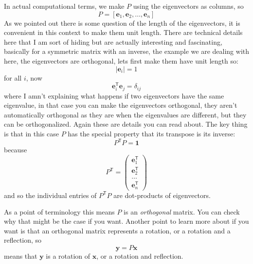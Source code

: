 \documentclass[12pt]{article}
\begin{document}
In actual computational terms, we make $P$ using the eigenvectors as
columns, so
\begin{equation}
  P=[\mathbf{e}_1,\mathbf{e}_2,\ldots,\mathbf{e}_n]
\end{equation}
As we pointed out there is some question of the length of the
eigenvectors, it is convenient in this context to make them unit
length. There are technical details here that I am sort of hiding but
are actually interesting and fascinating, basically for a symmetric
matrix with an inverse, the example we are dealing with here, the
eigenvectors are orthogonal, lets first make them have unit length so:
\begin{equation}
|\mathbf{e}_i|=1
\end{equation}
for all $i$, now
\begin{equation}
\mathbf{e}_i^{\mathsf T}\mathbf{e}_j=\delta_{ij}
\end{equation}
where I amn't explaining what happens if two eigenvectors have the
same eigenvalue, in that case you can make the eigenvectors
orthogonal, they aren't automatically orthogonal as they are when the
eigenvalues are different, but they can be orthogonalized. Again these
are details you can read about. The key thing is that in this case $P$
has the special property that its transpose is its inverse:
\begin{equation}
P^{\mathsf T}P=\mathbf{1}
\end{equation}
because
\begin{equation}
  P^{\mathsf T}=\begin{pmatrix} \mathbf{e}_1^{\mathsf T}\\ \mathbf{e}_2^{\mathsf T}\\\ldots\\ \mathbf{e}_n^{\mathsf T}
  \end{pmatrix}
\end{equation}
and so the individual entries of $P^{\mathsf T}P$ are dot-products of eigenvectors.

As a point of terminology this means $P$ is an \textsl{orthogonal}
matrix.  You can check why that might be the case if you want. Another
point to learn more about if you want is that an orthogonal matrix
represents a rotation, or a rotation and a reflection, so
\begin{equation}
\mathbf{y}=P\mathbf{x}
\end{equation}
means that $\mathbf{y}$ is a rotation of $\mathbf{x}$, or a rotation and reflection.
\end{document}
